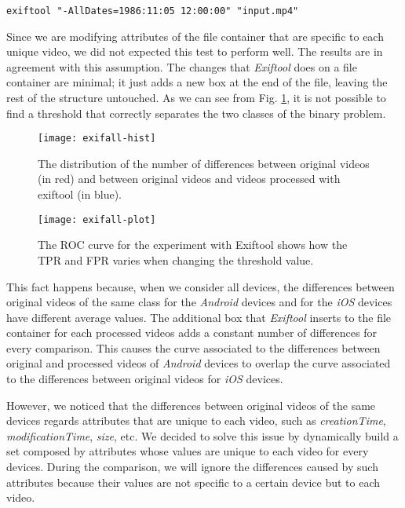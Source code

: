 \begin{lstlisting}
exiftool "-AllDates=1986:11:05 12:00:00" "input.mp4"
\end{lstlisting}

Since we are modifying attributes of the file container that are specific to each unique video, we did not expected this test to perform well. The results are in agreement with this assumption. The changes that \emph{Exiftool} does on a file container are minimal; it just adds a new box at the end of the file, leaving the rest of the structure untouched. As we can see from Fig. \ref{fig:exifaal-hist}, it is not possible to find a threshold that correctly separates the two classes of the binary problem.

\begin{figure}
  \centering
  \texttt{[image: exifall-hist]}
  \caption{The distribution of the number of differences between original videos (in red) and between original videos and videos processed with exiftool (in blue).}\label{fig:exifaal-hist}
\end{figure}

\begin{figure}
  \centering
  \texttt{[image: exifall-plot]}
  \caption{The ROC curve for the experiment with Exiftool shows how the TPR and FPR varies when changing the threshold value.}\label{fig:brand-roc}
\end{figure}

This fact happens because, when we consider all devices, the differences between original videos of the same class for the \emph{Android} devices and for the \emph{iOS} devices have different average values. The additional box that \emph{Exiftool} inserts to the file container for each processed videos adds a constant number of differences for every comparison. This causes the curve associated to the differences between original and processed videos of \emph{Android} devices to overlap the curve associated to the differences between original videos for \emph{iOS} devices.

However, we noticed that the differences between original videos of the same devices regards attributes that are unique to each video, such as \emph{creationTime}, \emph{modificationTime}, \emph{size}, etc. We decided to solve this issue by dynamically build a set composed by attributes whose values are unique to each video for every devices. During the comparison, we will ignore the differences caused by such attributes because their values are not specific to a certain device but to each video.

